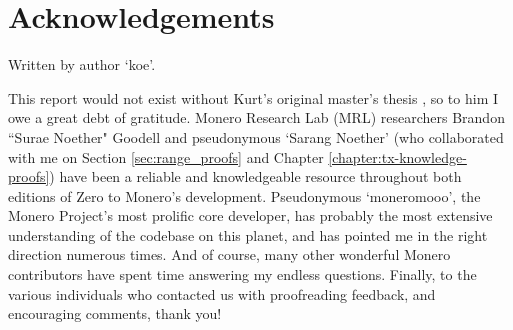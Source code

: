 \section{Acknowledgements}
\label{sec:acknowledgements}

Written by author `koe'.

This report would not exist without Kurt's original master's thesis \cite{kurt-original}, so to him I owe a great debt of gratitude. Monero Research Lab (MRL) researchers Brandon ``Surae Noether" Goodell and pseudonymous `Sarang Noether' (who collaborated with me on Section \ref{sec:range_proofs} and Chapter \ref{chapter:tx-knowledge-proofs}) have been a reliable and knowledgeable resource throughout both editions of Zero to Monero's development. Pseudonymous `moneromooo', the Monero Project's most prolific core developer, has probably the most extensive understanding of the codebase on this planet, and has pointed me in the right direction numerous times. And of course, many other wonderful Monero contributors have spent time answering my endless questions. Finally, to the various individuals who contacted us with proofreading feedback, and encouraging comments, thank you!